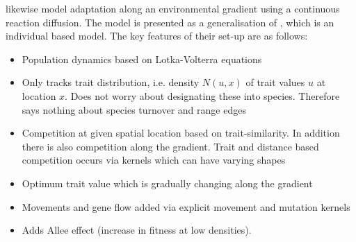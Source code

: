 \documentclass[a4paper,11pt]{article}
\begin{document}
\cite{Leimar-2008} likewise model adaptation along an environmental gradient using a continuous reaction diffusion. The model is presented as a generalisation of \citet{Doebeli-2003}, which is an individual based model. The key features of their set-up are as follows:
\begin{itemize}
  \item Population dynamics based on Lotka-Volterra equations
  \item Only tracks trait distribution, i.e. density $N(u,x)$ of trait values $u$ at location $x$. Does not worry about designating these into species. Therefore says nothing about species turnover and range edges
  \item Competition at given spatial location based on trait-similarity. In addition there is also competition along the gradient. Trait and distance based competition occurs via kernels which can have varying shapes
  \item Optimum trait value which is gradually changing along the gradient
  \item Movements and gene flow added via explicit movement and mutation kernels
  \item Adds Allee effect (increase in fitness at low densities).
\end{itemize}


\clearpage



\end{document}
